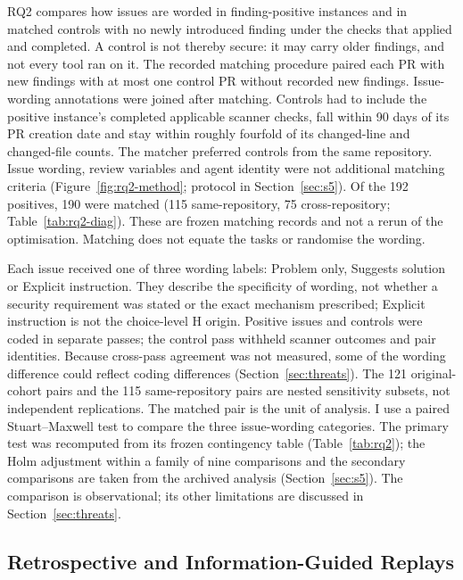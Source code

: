 \documentclass[acmsmall,screen,nonacm]{acmart}
\begin{document}
RQ2 compares how issues are worded in finding-positive instances and in matched controls with no newly introduced finding under the checks that applied and completed. A control is not thereby secure: it may carry older findings, and not every tool ran on it. The recorded matching procedure paired each PR with new findings with at most one control PR without recorded new findings. Issue-wording annotations were joined after matching. Controls had to include the positive instance's completed applicable scanner checks, fall within 90 days of its PR creation date and stay within roughly fourfold of its changed-line and changed-file counts. The matcher preferred controls from the same repository. Issue wording, review variables and agent identity were not additional matching criteria (Figure~\ref{fig:rq2-method}; protocol in Section~\ref{sec:s5}). Of the 192 positives, 190 were matched (115 same-repository, 75 cross-repository; Table~\ref{tab:rq2-diag}). These are frozen matching records and not a rerun of the optimisation. Matching does not equate the tasks or randomise the wording.

Each issue received one of three wording labels: Problem only, Suggests solution or Explicit instruction. They describe the specificity of wording, not whether a security requirement was stated or the exact mechanism prescribed; Explicit instruction is not the choice-level H origin. Positive issues and controls were coded in separate passes; the control pass withheld scanner outcomes and pair identities. Because cross-pass agreement was not measured, some of the wording difference could reflect coding differences (Section~\ref{sec:threats}). The 121 original-cohort pairs and the 115 same-repository pairs are nested sensitivity subsets, not independent replications. The matched pair is the unit of analysis. I use a paired Stuart--Maxwell test to compare the three issue-wording categories. The primary test was recomputed from its frozen contingency table (Table~\ref{tab:rq2}); the Holm adjustment within a family of nine comparisons and the secondary comparisons are taken from the archived analysis (Section~\ref{sec:s5}). The comparison is observational; its other limitations are discussed in Section~\ref{sec:threats}.

\subsection{Retrospective and Information-Guided Replays}\label{sec:rq3-design}
\end{document}
